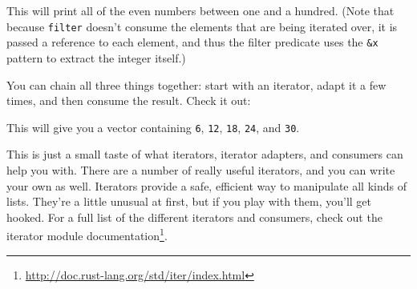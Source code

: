 \documentclass[a4paper,]{book}
\newenvironment{Shaded}{\begin{snugshade}}{\end{snugshade}}
\newcommand{\KeywordTok}[1]{\textcolor[rgb]{0.13,0.29,0.53}{\textbf{{#1}}}}
\newcommand{\DecValTok}[1]{\textcolor[rgb]{0.00,0.00,0.81}{{#1}}}
\newcommand{\StringTok}[1]{\textcolor[rgb]{0.31,0.60,0.02}{{#1}}}
\newcommand{\OtherTok}[1]{\textcolor[rgb]{0.56,0.35,0.01}{{#1}}}
\newcommand{\NormalTok}[1]{{#1}}
\renewcommand{\href}[2]{#2\footnote{\url{#1}}}
\begin{document}
\begin{Shaded}
\end{Shaded}

This will print all of the even numbers between one and a hundred. (Note
that because \texttt{filter} doesn't consume the elements that are being
iterated over, it is passed a reference to each element, and thus the
filter predicate uses the \texttt{\&x} pattern to extract the integer
itself.)

You can chain all three things together: start with an iterator, adapt
it a few times, and then consume the result. Check it out:

\begin{Shaded}
\end{Shaded}

This will give you a vector containing \texttt{6}, \texttt{12},
\texttt{18}, \texttt{24}, and \texttt{30}.

This is just a small taste of what iterators, iterator adapters, and
consumers can help you with. There are a number of really useful
iterators, and you can write your own as well. Iterators provide a safe,
efficient way to manipulate all kinds of lists. They're a little unusual
at first, but if you play with them, you'll get hooked. For a full list
of the different iterators and consumers, check out the
\href{http://doc.rust-lang.org/std/iter/index.html}{iterator module
documentation}.

\end{document}
